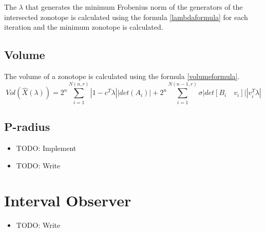 The $\lambda$ that generates the minimum Frobenius norm of the generators of the intersected zonotope is calculated using the formula \ref{lambdaformula} for each iteration and the minimum zonotope is calculated.

\subsection{Volume}
The volume of a zonotope is calculated using the formula \ref{volumeformula}.
\begin{equation}
\label{volumeformula}
Vol(\hat{X}(\lambda)) = 2^n \sum^{N(n,r)}_{i=1} |1- c^T \lambda||det(A_i)| + 2^n \sum^{N(n-1,r)}_{i=1} \sigma|det[B_i \quad v_i]||v_i^T\lambda|
\end{equation}

\subsection{P-radius}
\begin{itemize}
\item TODO: Implement
\item TODO: Write
\end{itemize}

\section{Interval Observer}
\begin{itemize}
\item TODO: Write
\end{itemize}